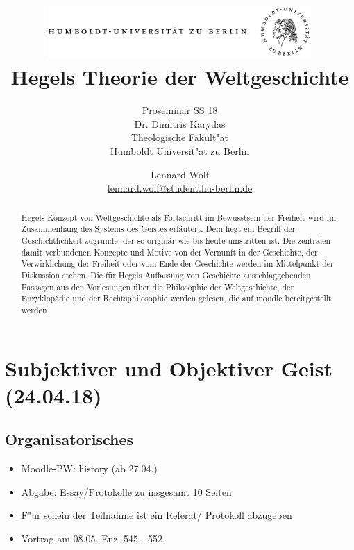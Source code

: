 \documentclass[emulatestandardclasses]{scrartcl}
\date{\vspace{-3ex}}
\begin{document}
\title{
	\includegraphics*[width=0.75\textwidth]{ErstesSem/images/hu_logo.png}\\
	\vspace{24pt}
	Hegels Theorie der Weltgeschichte}
\subtitle{Proseminar SS 18\\
          Dr. Dimitris Karydas\\
          Theologische Fakult"at \\ 
          Humboldt Universit"at zu Berlin}
\author{Lennard Wolf\\
        \small{\href{mailto:lennard.wolf@student.hu-berlin.de}{lennard.wolf@student.hu-berlin.de}}}
\maketitle
\begin{abstract}

Hegels Konzept von Weltgeschichte als Fortschritt im Bewusstsein der Freiheit wird im Zusammenhang des Systems des Geistes erläutert. Dem liegt ein Begriff der Geschichtlichkeit zugrunde, der so originär wie bis heute umstritten ist. Die zentralen damit verbundenen Konzepte und Motive von der Vernunft in der Geschichte, der Verwirklichung der Freiheit oder vom Ende der Geschichte werden im Mittelpunkt der Diskussion stehen. Die für Hegels Auffassung von Geschichte ausschlaggebenden Passagen aus den Vorlesungen über die Philosophie der Weltgeschichte, der Enzyklopädie und der Rechtsphilosophie werden gelesen, die auf moodle bereitgestellt werden.
\end{abstract}
\newpage

\tableofcontents
\listoffigures
\newpage


\section{Subjektiver und Objektiver Geist\\(24.04.18)}

\subsection{Organisatorisches}

\begin{itemize}
  \item Moodle-PW: history (ab 27.04.)
  \item Abgabe: Essay/Protokolle zu insgesamt 10 Seiten
  \item F"ur schein der Teilnahme ist ein Referat/ Protokoll abzugeben
  \item Vortrag am 08.05. Enz. 545 - 552
\end{itemize}
\end{document}
